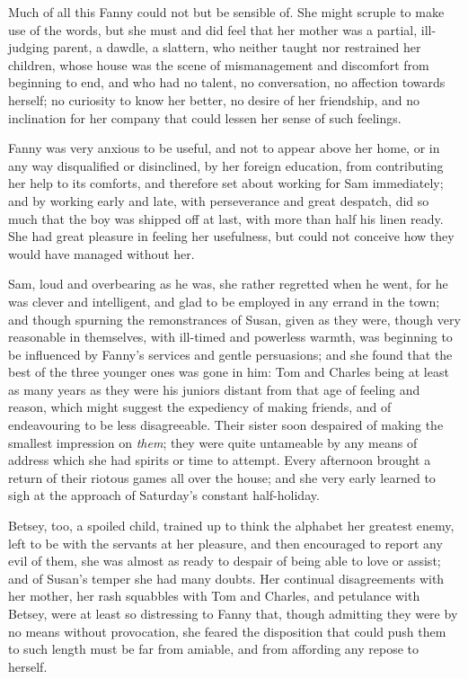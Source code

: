 Much of all this Fanny could not but be sensible of.
She might scruple to make use of the words, but she
must and did feel that her mother was a partial,
ill-judging parent, a dawdle, a slattern, who neither taught
nor restrained her children, whose house was the scene
of mismanagement and discomfort from beginning to end,
and who had no talent, no conversation, no affection
towards herself; no curiosity to know her better,
no desire of her friendship, and no inclination for her
company that could lessen her sense of such feelings.

Fanny was very anxious to be useful, and not to appear above
her home, or in any way disqualified or disinclined, by her
foreign education, from contributing her help to its comforts,
and therefore set about working for Sam immediately;
and by working early and late, with perseverance and
great despatch, did so much that the boy was shipped
off at last, with more than half his linen ready.
She had great pleasure in feeling her usefulness, but could
not conceive how they would have managed without her.

Sam, loud and overbearing as he was, she rather regretted
when he went, for he was clever and intelligent, and glad
to be employed in any errand in the town; and though
spurning the remonstrances of Susan, given as they were,
though very reasonable in themselves, with ill-timed
and powerless warmth, was beginning to be influenced
by Fanny's services and gentle persuasions; and she found
that the best of the three younger ones was gone in him:
Tom and Charles being at least as many years as they were
his juniors distant from that age of feeling and reason,
which might suggest the expediency of making friends,
and of endeavouring to be less disagreeable.  Their sister
soon despaired of making the smallest impression on \emph{them};
they were quite untameable by any means of address which she
had spirits or time to attempt.  Every afternoon brought
a return of their riotous games all over the house; and she
very early learned to sigh at the approach of Saturday's
constant half-holiday.

Betsey, too, a spoiled child, trained up to think the
alphabet her greatest enemy, left to be with the servants
at her pleasure, and then encouraged to report any evil
of them, she was almost as ready to despair of being
able to love or assist; and of Susan's temper she had
many doubts.  Her continual disagreements with her mother,
her rash squabbles with Tom and Charles, and petulance
with Betsey, were at least so distressing to Fanny that,
though admitting they were by no means without provocation,
she feared the disposition that could push them to such
length must be far from amiable, and from affording
any repose to herself.

